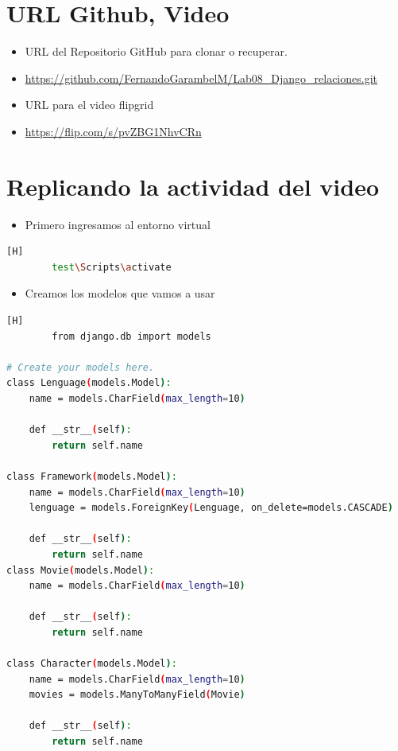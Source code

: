 \documentclass{article}
\begin{document}
\section{URL Github, Video}
	\begin{itemize}
		\item URL del Repositorio GitHub para clonar o recuperar.
		\item \url{https://github.com/FernandoGarambelM/Lab08_Django_relaciones.git}
		\item URL para el video flipgrid
		\item \url{https://flip.com/s/pvZBG1NhvCRn}	
	\end{itemize}
	\clearpage
\section{Replicando la actividad del video}
	\begin{itemize}
		\item Primero ingresamos al entorno virtual
	\end{itemize}
	\begin{lstlisting}[language=bash,caption={Activar el ambiente virtual}][H]
		test\Scripts\activate
	\end{lstlisting}
	\begin{itemize}
		\item Creamos los modelos que vamos a usar
	\end{itemize}
	\begin{lstlisting}[language=bash,caption={Codigo de models.py}][H]
		from django.db import models

# Create your models here.
class Lenguage(models.Model):
    name = models.CharField(max_length=10)
    
    def __str__(self):
        return self.name
    
class Framework(models.Model):
    name = models.CharField(max_length=10)
    lenguage = models.ForeignKey(Lenguage, on_delete=models.CASCADE)

    def __str__(self):
        return self.name
class Movie(models.Model):
    name = models.CharField(max_length=10)

    def __str__(self):
        return self.name
    
class Character(models.Model):
    name = models.CharField(max_length=10)
    movies = models.ManyToManyField(Movie)

    def __str__(self):
        return self.name
	\end{lstlisting}
\end{document}
